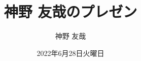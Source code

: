 \documentclass[aspectratio=1610,dvipdfmx,12pt]{beamer}
\title{神野 友哉のプレゼン}
\author{神野 友哉}
\institute{愛知県立大学 情報科学部}
\date{2022年6月28日火曜日}
\begin{document}
  \titlepage
\end{document}
